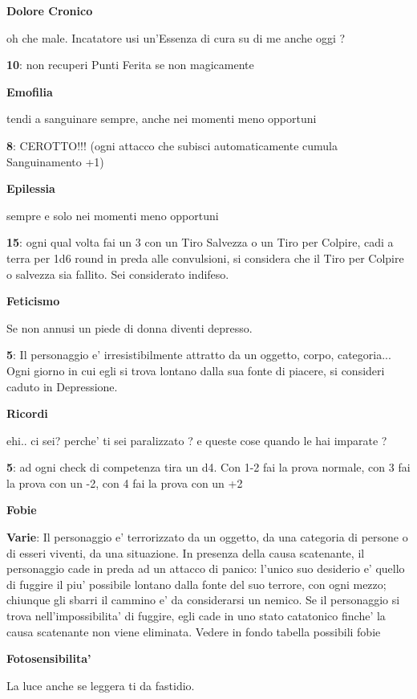 \documentclass[a4paper,11pt,twoside,openany]{book}
\begin{document}
{\textbf{Dolore Cronico}

oh che male. Incatatore usi un'Essenza di cura su di me anche oggi ?

\textbf{10}: non recuperi Punti Ferita se non magicamente

\textbf{Emofilia}

tendi a sanguinare sempre, anche nei momenti meno opportuni

\textbf{8}: CEROTTO!!! (ogni attacco che subisci automaticamente cumula Sanguinamento +1)

\textbf{Epilessia}

sempre e solo nei momenti meno opportuni

\textbf{15}: ogni qual volta fai un 3 con un Tiro Salvezza o un Tiro per Colpire, cadi a terra per 1d6 round in preda alle convulsioni, si considera che il Tiro per Colpire o salvezza sia fallito. Sei considerato indifeso.

\textbf{Feticismo}

Se non annusi un piede di donna diventi depresso.

\textbf{5}: Il personaggio e' irresistibilmente attratto da un oggetto, corpo, categoria... Ogni giorno in cui egli si trova lontano dalla sua fonte di piacere, si consideri caduto in Depressione.

\textbf{Ricordi}

ehi.. ci sei? perche' ti sei paralizzato ? e queste cose quando le hai imparate ?

\textbf{5}: ad ogni check di competenza tira un d4. Con 1-2 fai la prova normale, con 3 fai la prova con un -2, con 4 fai la prova con un +2

\textbf{Fobie}

\textbf{Varie}: Il personaggio e' terrorizzato da un oggetto, da una categoria di persone o di esseri viventi, da una situazione. In presenza della causa scatenante, il personaggio cade in preda ad un attacco di panico: l'unico suo desiderio e' quello di fuggire il piu' possibile lontano dalla fonte del suo terrore, con ogni mezzo; chiunque gli sbarri il cammino e' da considerarsi un nemico. Se il personaggio si trova nell'impossibilita' di fuggire, egli cade in uno stato catatonico finche' la causa scatenante non viene eliminata. Vedere in fondo tabella possibili fobie

\textbf{Fotosensibilita'}

La luce anche se leggera ti da fastidio.

}
\end{document}
